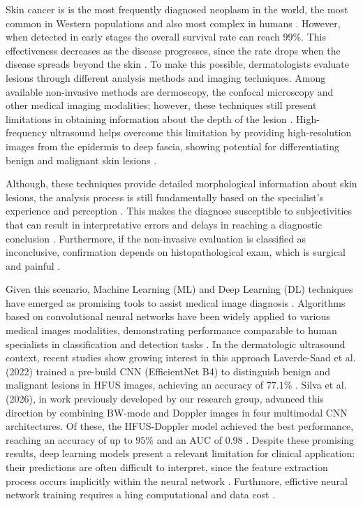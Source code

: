 \documentclass[12pt,a4paper]{article}
\begin{document}
Skin cancer is is the most frequently diagnosed neoplasm in the world, the most common in Western populations and also most complex in humans \cite{Juan2023, Zhu2024}. However, when detected in early stages the overall survival rate can reach $99\%$. This effectiveness decreases as the disease progresses, since the rate drops when the disease spreads beyond the skin \cite{GOYAL2020}. To make this possible, dermatologists evaluate lesions through different analysis methods and imaging techniques. Among available non-invasive methods are dermoscopy, the confocal microscopy and other medical imaging modalities; however, these techniques still present limitations in obtaining information about the depth of the lesion \cite{Xiao2025, Zhu2024}. High-frequency ultrasound helps overcome this limitation by providing high-resolution images from the epidermis to deep fascia, showing potential for differentiating benign and malignant skin lesions \cite{daSilva2026, Czajkowska2021}.

Although, these techniques provide detailed morphological information about skin lesions, the analysis process is still fundamentally based on the specialist's experience and perception \cite{Qin2025}. This makes the diagnose susceptible to subjectivities that can result in interpretative errors and delays in reaching a diagnostic conclusion \cite{Qin2025}. Furthermore, if the non-invasive evaluation is classified as inconclusive, confirmation depends on histopathological exam, which is surgical and painful \cite{Qin2025, Zhu2024}.

Given this scenario, Machine Learning (ML) and Deep Learning (DL) techniques have emerged as promising tools to assist medical image diagnosis \cite{daSilva2026}. Algorithms based on convolutional neural networks have been widely applied to various medical images modalities, demonstrating performance comparable to human specialists in classification and detection tasks \cite{LaverdeSaad2021}. In the dermatologic ultrasound context, recent studies show growing interest in this approach Laverde-Saad et al. (2022) trained a pre-build CNN (EfficientNet B4) to distinguish benign and malignant lesions in HFUS images, achieving an accuracy of $77.1\%$ \cite{LaverdeSaad2021}. Silva et al. (2026), in work previously developed by our research group, advanced this direction by combining BW-mode and Doppler images in four multimodal CNN architectures. Of these, the HFUS-Doppler model achieved the best performance, reaching an accuracy of up to $95\%$ and an AUC of 0.98 \cite{daSilva2026}. Despite these promising results, deep learning models present a relevant limitation for clinical application: their predictions are often difficult to interpret, since the feature extraction process occurs implicitly within the neural network \cite{Qin2025}. Furthmore, effictive neural network training requires a hing computational and data cost \cite{LaverdeSaad2021}. 
\end{document}
